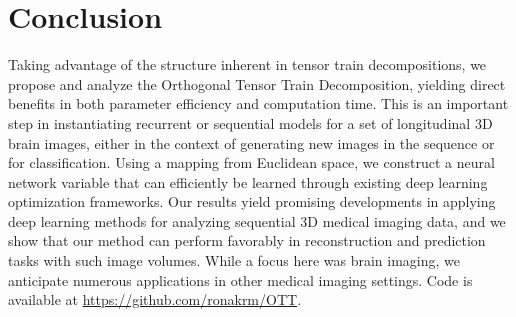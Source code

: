 \section{Conclusion}
Taking advantage of the structure inherent in tensor train decompositions, we propose and
analyze the Orthogonal Tensor Train Decomposition, yielding direct benefits in both parameter
efficiency and computation time. This is an important step
in instantiating recurrent or sequential models for a set of longitudinal 3D brain images,
either in the context of generating new images in the sequence or for classification. 
Using a mapping from Euclidean space, we construct a neural network
variable that can efficiently be learned through existing deep learning optimization frameworks.
Our results yield promising
developments in applying 
deep learning methods for analyzing sequential 3D medical imaging data, and
we show that our method can perform favorably in reconstruction and
prediction tasks with such image volumes.
While a focus here was brain imaging,
we anticipate numerous applications in other medical imaging settings.
Code is available at \url{https://github.com/ronakrm/OTT}.
